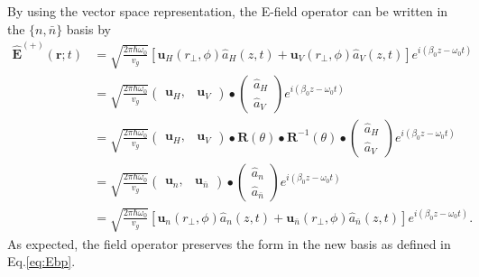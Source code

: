 \documentclass[preprint,aps,pra,onecolumn,superscriptaddress]{revtex4-1} %
\def\br{\mathbf{r}}
\begin{document}
\begin{appendix}
By using the vector space representation, the E-field operator can be written in the $ \{n,\bar{n}\} $ basis by 
\begin{align}
\hat{\mathbf{E}}^{(+)}(\br;t) &= \sqrt{ \frac{2 \pi \hbar \omega_0}{ v_g} } \left[\mathbf{u}_H(r\!_\perp,\phi) \hat{a}_H(z,t) + \mathbf{u}_V(r\!_\perp,\phi) \hat{a}_V(z,t)\right]  e^{i (\beta_0 z- \omega_0 t)}\\
&= \sqrt{ \frac{2 \pi \hbar \omega_0}{ v_g} } \left(\!\begin{array}{cc}\mathbf{u}_H, & \mathbf{u}_V\end{array}\!\right)
\bullet \left(\!\begin{array}{c}\hat{a}_H\\ \hat{a}_V\end{array} \!\right)  e^{i (\beta_0 z- \omega_0 t)}\\
&= \sqrt{ \frac{2 \pi \hbar \omega_0}{ v_g} } \left(\!\begin{array}{cc}\mathbf{u}_H, & \mathbf{u}_V\end{array}\!\right)\bullet\mathbf{R}(\theta)
\bullet \mathbf{R}^{-1}(\theta)\bullet\left(\!\begin{array}{c}\hat{a}_H\\ \hat{a}_V\end{array} \!\right)  e^{i (\beta_0 z- \omega_0 t)}\\
&= \sqrt{ \frac{2 \pi \hbar \omega_0}{ v_g} } \left(\!\begin{array}{cc}\mathbf{u}_n, & \mathbf{u}_{\bar{n}}\end{array}\!\right)
\bullet \left(\!\begin{array}{c}\hat{a}_n\\ \hat{a}_{\bar{n}}\end{array} \!\right)  e^{i (\beta_0 z- \omega_0 t)}\\
&= \sqrt{ \frac{2 \pi \hbar \omega_0}{ v_g} } \left[\mathbf{u}_n(r\!_\perp,\phi) \hat{a}_n(z,t) + \mathbf{u}_{\bar{n}}(r\!_\perp,\phi) \hat{a}_{\bar{n}}(z,t)\right]  e^{i (\beta_0 z- \omega_0 t)}.\label{eq:Efieldop_nnbar}
\end{align}
As expected, the field operator preserves the form in the new basis as defined in Eq.\eqref{eq:Ebp}.


\end{appendix}
\end{document}
